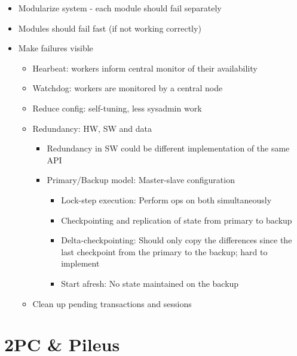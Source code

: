 \documentclass[a4paper]{article}
\begin{document}
\begin{itemize}
\item
    Modularize system - each module should fail separately
\item
    Modules should fail fast (if not working correctly)
\item
    Make failures visible
    \begin{itemize}
        \item
        Hearbeat: workers inform central monitor of their availability
    \item
        Watchdog: workers are monitored by a central node
    \item
        Reduce config: self-tuning, less sysadmin work
    \item
        Redundancy: HW, SW and data
        \begin{itemize}
                \item
            Redundancy in SW could be different implementation of the same API
        \item
            Primary/Backup model: Master-slave configuration

            \begin{itemize}
            \item
                Lock-step execution: Perform ops on both simultaneously
            \item
                Checkpointing and replication of state from primary to backup
            \item
                Delta-checkpointing: Should only copy the differences since the
                last checkpoint from the primary to the backup; hard to
                implement
            \item
                Start afresh: No state maintained on the backup
            \end{itemize}
        \end{itemize}
    \item
        Clean up pending transactions and sessions
    \end{itemize}
\end{itemize}

\newpage

\section{2PC \& Pileus}
\end{document}
